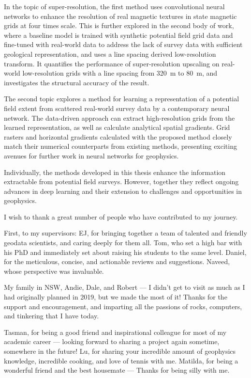 \documentclass[12pt,a4paper,notitlepage]{report} %
\begin{document}
In the topic of super-resolution, the first method uses convolutional neural networks to enhance the resolution of real magnetic textures in state magnetic grids at four times scale.
This is further explored in the second body of work, where a baseline model is trained with synthetic potential field grid data and fine-tuned with real-world data to address the lack of survey data with sufficient geological representation, and uses a line spacing derived low-resolution transform.
It quantifies the performance of super-resolution upscaling on real-world low-resolution grids with a line spacing from \SI{320}{\m} to \SI{80}{\m}, and investigates the structural accuracy of the result.

The second topic explores a method for learning a representation of a potential field extent from scattered real-world survey data by a contemporary neural network.
The data-driven approach can extract high-resolution grids from the learned representation, as well as calculate analytical spatial gradients.
Grid rasters and horizontal gradients calculated with the proposed method closely match their numerical counterparts from existing methods, presenting exciting avenues for further work in neural networks for geophysics.

Individually, the methods developed in this thesis enhance the information extractable from potential field surveys.
However, together they reflect ongoing advances in deep learning and their extension to challenges and opportunities in geophysics.

\newpage{}

I wish to thank a great number of people who have contributed to my journey.

First, to my supervisors:
EJ, for bringing together a team of talented and friendly geodata scientists, and caring deeply for them all.
Tom, who set a high bar with his PhD and immediately set about raising his students to the same level.
Daniel, for the meticulous, concise, and actionable reviews and suggestions.
Naveed, whose perspective was invaluable.

My family in NSW, Andie, Dale, and Robert --- I didn't get to visit as much as I had originally planned in 2019, but we made the most of it! Thanks for the support and encouragement, and imparting all the passions of rocks, computers, and tinkering that I have today.

Tasman, for being a good friend and inspirational colleague for most of my academic career --- looking forward to sharing a project again sometime, somewhere in the future!
Lu, for sharing your incredible amount of geophysics knowledge, incredible cooking, and love of tennis with me.
Matilda, for being a wonderful friend and the best housemate --- Thanks for being silly with me.
\end{document}
